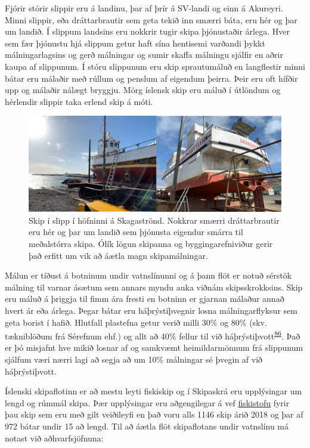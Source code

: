 \documentclass[icelandic,]{book}
\begin{document}
Fjórir stórir slippir eru á landinu, þar af þrír á SV-landi og einn á Akureyri. Minni slippir, eða dráttarbrautir sem geta tekið inn smærri báta, eru hér og þar um landið. Í slippum landsins eru nokkrir tugir skipa þjónustaðir árlega. Hver sem fær þjónustu hjá slippum getur haft sína hentisemi varðandi þykkt málningarlagsins og gerð málningar og sumir skaffa málningu sjálfir en aðrir kaupa af slippunum. Í stóru slippunum eru skip sprautumáluð en langflestir minni bátar eru málaðir með rúllum og penslum af eigendum þeirra. Þeir eru oft hífðir upp og málaðir nálægt bryggju. Mörg íslensk skip eru máluð í útlöndum og hérlendir slippir taka erlend skip á móti.

\begin{figure}

{\centering \includegraphics[width=1\linewidth]{myndir/slippurb} 

}

\caption{Skip í slipp í höfninni á Skagaströnd. Nokkrar smærri dráttarbrautir eru hér og þar um landið sem þjónusta eigendur smárra til meðalstórra skipa. Ólík lögun skipanna og byggingarefniviður gerir það erfitt um vik að áætla magn skipamálningar.}\label{fig:Slippur}
\end{figure}

Málun er tíðust á botninum undir vatnslínunni og á þann flöt er notuð sérstök málning til varnar ásætum sem annars myndu auka viðnám skipsskrokksins. Skip eru máluð á þriggja til fimm ára fresti en botninn er gjarnan málaður annað hvert ár eða árlega. Þegar bátar eru háþrýstiþvegnir losna málningarflyksur sem geta borist í hafið. Hlutfall plastefna getur verið milli 30\% og 80\% (skv. tækniblöðum frá Sérefnum ehf.) og allt að 40\% fellur til við háþrýstiþvott\textsuperscript{\protect\hyperlink{ref-Verschoor2016}{86}}. Það er þó misjafnt hve mikið losnar af og samkvæmt heimildarmönnum frá slippunum sjálfum væri nærri lagi að segja að um 10\% málningar sé þvegin af við háþrýstiþvott.

Íslenski skipaflotinn er að mestu leyti fiskiskip og í Skipaskrá eru upplýsingar um lengd og rúmmál skipa. Þær upplýsingar eru aðgengilegar á vef \href{http://www.fiskistofa.is/}{fiskistofu} fyrir þau skip sem eru með gilt veiðileyfi en það voru alls 1146 skip árið 2018 og þar af 972 bátar undir 15 að lengd. Til að áætla flöt skipaflotans undir vatnslínu má notast við aðhvarfsjöfnuna:
\end{document}
